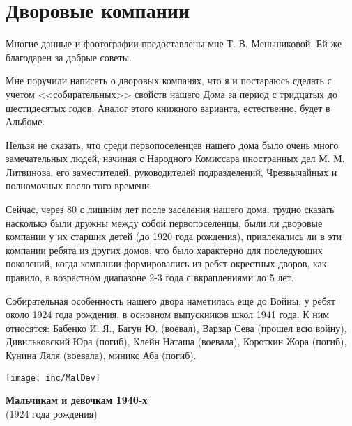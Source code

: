 \chapter{Дворовые компании}

Многие данные и фоотографии предоставлены мне Т. В. Меньшиковой. Ей же благодарен за добрые советы.

Мне поручили написать о дворовых компанях, что я и постараюсь сделать с учетом <<собирательных>> свойств нашего Дома за период с тридцатых до шестидесятых годов. Аналог этого книжного варианта, естественно, будет в Альбоме.

Нельзя не сказать, что среди первопоселенцев нашего дома было очень много замечательных людей, начиная с Народного Комиссара иностранных дел М. М. Литвинова, его заместителей, руководителей подразделений, Чрезвычайных и полномочных посло того времени.

Сейчас, через 80 с лишним лет после заселения нашего дома, трудно сказать насколько были дружны между собой первопоселенцы, были ли дворовые компании у их старших детей (до 1920 года рождения), привлекались ли в эти компании ребята из других домов, что было характерно для последующих поколений, когда компании формировались из ребят окрестных дворов, как правило, в возрастном диапазоне 2-3 года с вкраплениями до 5 лет.

Собирательная особенность нашего двора наметилась еще до Войны, у ребят около 1924 года рождения, в основном выпускников школ 1941 года. К ним относятся: Бабенко И. Я., Багун Ю. (воевал), Варзар Сева (прошел всю войну), Дивильковский Юра (погиб), Клейн Наташа (воевала), Короткин Жора (погиб), Кунина Ляля (воевала), миникс Аба (погиб).

\newpage %

\begin{center}
    \texttt{[image: inc/MalDev]}
\end{center}
\begin{center}
    \footnotesize{
    \textbf {Мальчикам и девочкам 1940-х} \\
    (1924 года рождения)
    }
\end{center}


